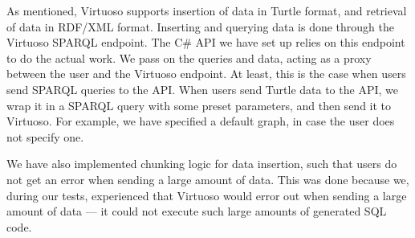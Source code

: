 As mentioned, Virtuoso supports insertion of data in Turtle format, and retrieval of data in RDF/XML format. Inserting and querying data is done through the Virtuoso SPARQL endpoint. The C\# API we have set up relies on this endpoint to do the actual work. We pass on the queries and data, acting as a proxy between the user and the Virtuoso endpoint. At least, this is the case when users send SPARQL queries to the API. When users send Turtle data to the API, we wrap it in a SPARQL query with some preset parameters, and then send it to Virtuoso. For example, we have specified a default graph, in case the user does not specify one.

We have also implemented chunking logic for data insertion, such that users do not get an error when sending a large amount of data. This was done because we, during our tests, experienced that Virtuoso would error out when sending a large amount of data --- it could not execute such large amounts of generated SQL code.